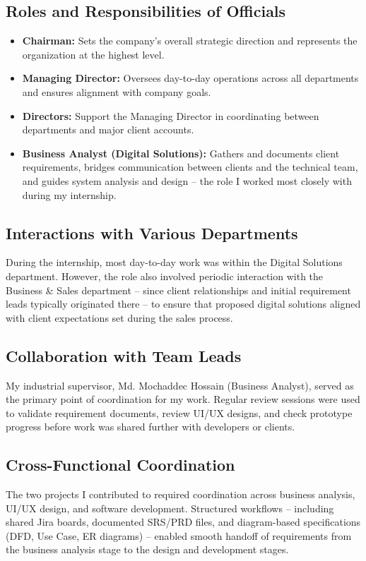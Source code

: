 \subsection{Roles and Responsibilities of Officials}
\begin{itemize}
    \item \textbf{Chairman:} Sets the company's overall strategic direction and represents the organization at the highest level.
    \item \textbf{Managing Director:} Oversees day-to-day operations across all departments and ensures alignment with company goals.
    \item \textbf{Directors:} Support the Managing Director in coordinating between departments and major client accounts.
    \item \textbf{Business Analyst (Digital Solutions):} Gathers and documents client requirements, bridges communication between clients and the technical team, and guides system analysis and design -- the role I worked most closely with during my internship.
\end{itemize}

\subsection{Interactions with Various Departments}
\par During the internship, most day-to-day work was within the Digital Solutions department. However, the role also involved periodic interaction with the Business \& Sales department -- since client relationships and initial requirement leads typically originated there -- to ensure that proposed digital solutions aligned with client expectations set during the sales process.

\subsection{Collaboration with Team Leads}
\par My industrial supervisor, Md. Mochaddec Hossain (Business Analyst), served as the primary point of coordination for my work. Regular review sessions were used to validate requirement documents, review UI/UX designs, and check prototype progress before work was shared further with developers or clients.

\subsection{Cross-Functional Coordination}
\par The two projects I contributed to required coordination across business analysis, UI/UX design, and software development. Structured workflows -- including shared Jira boards, documented SRS/PRD files, and diagram-based specifications (DFD, Use Case, ER diagrams) -- enabled smooth handoff of requirements from the business analysis stage to the design and development stages.

